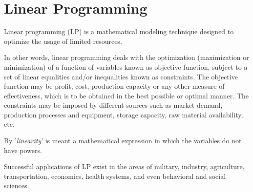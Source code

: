 \documentclass[../main-sheet.tex]{subfiles}
\begin{document}
\chapter{Linear Programming}
Linear programming (LP) is a mathematical modeling technique designed to optimize the usage of limited resources.

In other words, linear programming deals with the optimization (maximization or minimization) of a function of variables known as objective function, subject to a set of linear equalities and/or inequalities known as constraints. The objective function may be profit, cost, production capacity or any other measure of effectiveness, which is to be obtained in the best possible or optimal manner. The constraints may be imposed by different sources such as market demand, production processes and equipment, storage capacity, raw material availability, etc.


By '\emph{linearity}' is meant a mathematical expression in which the variables do not have powers.


Successful applications of LP exist in the areas of military, industry, agriculture, transportation, economics, health systems, and even behavioral and social sciences.
\end{document}
